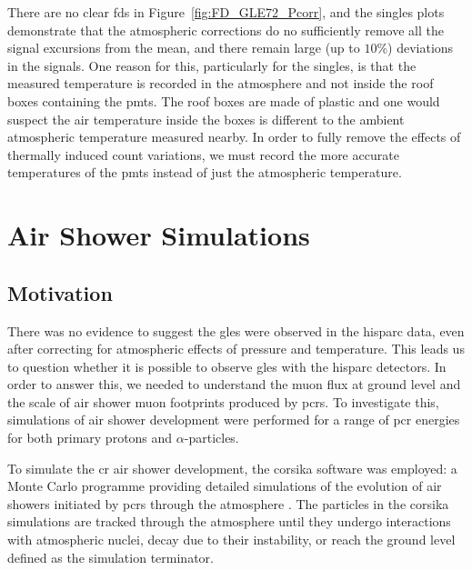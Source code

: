 There are no clear \glspl{fd} in Figure~\ref{fig:FD_GLE72_Pcorr}, and the singles plots demonstrate that the atmospheric corrections do no sufficiently remove all the signal excursions from the mean, and there remain large (up to $10\%$) deviations in the signals. One reason for this, particularly for the singles, is that the measured temperature is recorded in the atmosphere and not inside the roof boxes containing the \glspl{pmt}. The roof boxes are made of plastic and one would suspect the air temperature inside the boxes is different to the ambient atmospheric temperature measured nearby. In order to fully remove the effects of thermally induced count variations, we must record the more accurate temperatures of the \glspl{pmt} instead of just the atmospheric temperature.



\section{Air Shower Simulations}\label{sec:CORSIKA}

\subsection{Motivation}

There was no evidence to suggest the \glspl{gle} were observed in the \gls{hisparc} data, even after correcting for atmospheric effects of pressure and temperature. This leads us to question whether it is possible to observe \glspl{gle} with the \gls{hisparc} detectors. In order to answer this, we needed to understand the muon flux at ground level and the scale of air shower muon footprints produced by \glspl{pcr}. To investigate this, simulations of air shower development were performed for a range of \gls{pcr} energies for both primary protons and $\alpha$-particles. 

To simulate the \gls{cr} air shower development, the \gls{corsika} software was employed: a Monte Carlo programme providing detailed simulations of the evolution of air showers initiated by \glspl{pcr} through the atmosphere \citep{heck_extensive_2017}. The particles in the \gls{corsika} simulations are tracked through the atmosphere until they undergo interactions with atmospheric nuclei, decay due to their instability, or reach the ground level defined as the simulation terminator.

